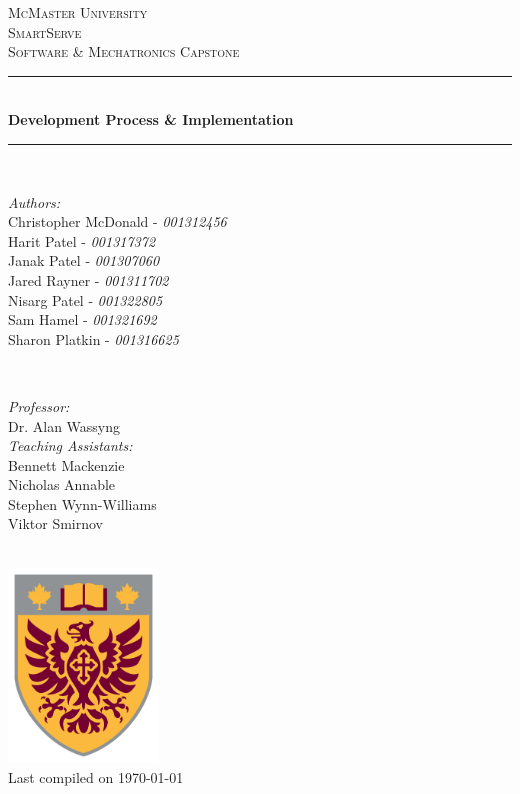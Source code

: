 \documentclass[11pt]{article}
\begin{document}
\begin{titlepage}
	\newcommand{\HRule}{\rule{\linewidth}{0.2mm}}
	\begin{center}
	\textsc{\LARGE McMaster University}\\[1.5cm]
	
	\textsc{\Large SmartServe}\\[0.5cm]
	\textsc{\large Software \& Mechatronics Capstone}\\[0.5cm] 

	\HRule\\[0.4cm]
		{\huge\bfseries Development Process \& Implementation}\\[0.4cm]
	\HRule\\[0.4cm]
	
	\begin{minipage}[t][][t]{0.5\textwidth}
		\begin{flushleft} \large
			\emph{Authors:}\\
			Christopher McDonald - \textit{001312456} \\
			Harit Patel - \textit{001317372}\\
			Janak Patel - \textit{001307060} \\
			Jared Rayner - \textit{001311702}\\
			Nisarg Patel - \textit{001322805} \\
			Sam Hamel - \textit{001321692} \\
			Sharon Platkin - \textit{001316625} \\
		\end{flushleft}
	\end{minipage}
	~
	\begin{minipage}[t][][t]{0.4\textwidth}
		\begin{flushright} \large
			\emph{Professor:} \\
			Dr. Alan Wassyng \\[0.4cm]
			\emph{Teaching Assistants:} \\
			Bennett Mackenzie \\ 
			Nicholas Annable \\ 
			Stephen Wynn-Williams \\ 
			Viktor Smirnov
		\end{flushright}
	\end{minipage}\\[2cm]
	
	\includegraphics[width=0.3\textwidth]{logo.png} \\
	{\large Last compiled on \today}
	\end{center}

\end{titlepage}
\end{document}
